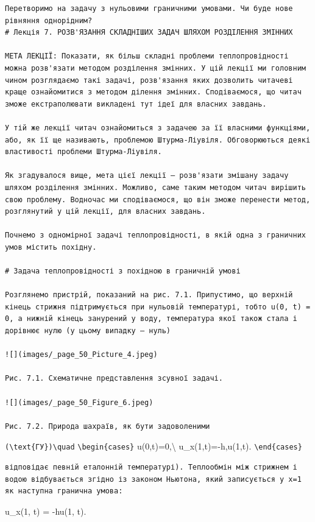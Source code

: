 \documentclass[
  ukrainian,
]{article}
\begin{document}
\begin{verbatim}
Перетворимо на задачу з нульовими граничними умовами. Чи буде нове рівняння однорідним?
# Лекція 7. РОЗВ'ЯЗАННЯ СКЛАДНІШИХ ЗАДАЧ ШЛЯХОМ РОЗДІЛЕННЯ ЗМІННИХ

МЕТА ЛЕКЦІЇ: Показати, як більш складні проблеми теплопровідності можна розв'язати методом розділення змінних. У цій лекції ми головним чином розглядаємо такі задачі, розв'язання яких дозволить читачеві краще ознайомитися з методом ділення змінних. Сподіваємося, що читач зможе екстраполювати викладені тут ідеї для власних завдань.

У тій же лекції читач ознайомиться з задачею за її власними функціями, або, як її ще називають, проблемою Штурма-Ліувіля. Обговорюються деякі властивості проблеми Штурма-Ліувіля.

Як згадувалося вище, мета цієї лекції — розв'язати змішану задачу шляхом розділення змінних. Можливо, саме таким методом читач вирішить свою проблему. Водночас ми сподіваємося, що він зможе перенести метод, розглянутий у цій лекції, для власних завдань.

Почнемо з одномірної задачі теплопровідності, в якій одна з граничних умов містить похідну.

# Задача теплопровідності з похідною в граничній умові

Розглянемо пристрій, показаний на рис. 7.1. Припустимо, що верхній кінець стрижня підтримується при нульовій температурі, тобто u(0, t) = 0, а нижній кінець занурений у воду, температура якої також стала і дорівнює нулю (у цьому випадку — нуль)

![](images/_page_50_Picture_4.jpeg)

Рис. 7.1. Схематичне представлення зсувної задачі.

![](images/_page_50_Figure_6.jpeg)

Рис. 7.2. Природа шахраїв, як бути задоволеними
\end{verbatim}

\texttt{(\textbackslash{}text\{ГУ\})\textbackslash{}quad}
\texttt{\textbackslash{}begin\{cases\}} u(0,t)=0,\textbackslash{}
u\_x(1,t)=-h,u(1,t). \texttt{\textbackslash{}end\{cases\}}

\begin{verbatim}
відповідає певній еталонній температурі). Теплообмін між стрижнем і водою відбувається згідно із законом Ньютона, який записується у x=1 як наступна гранична умова:
\end{verbatim}

u\_x(1, t) = -hu(1, t).
\end{document}
